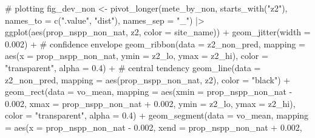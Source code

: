 \documentclass[
  letterpaper,
  DIV=11,
  numbers=noendperiod]{scrartcl}
\newenvironment{Shaded}{\begin{snugshade}}{\end{snugshade}}
\newcommand{\AttributeTok}[1]{\textcolor[rgb]{0.40,0.45,0.13}{#1}}
\newcommand{\CommentTok}[1]{\textcolor[rgb]{0.37,0.37,0.37}{#1}}
\newcommand{\FloatTok}[1]{\textcolor[rgb]{0.68,0.00,0.00}{#1}}
\newcommand{\FunctionTok}[1]{\textcolor[rgb]{0.28,0.35,0.67}{#1}}
\newcommand{\NormalTok}[1]{\textcolor[rgb]{0.00,0.23,0.31}{#1}}
\newcommand{\OtherTok}[1]{\textcolor[rgb]{0.00,0.23,0.31}{#1}}
\newcommand{\SpecialCharTok}[1]{\textcolor[rgb]{0.37,0.37,0.37}{#1}}
\newcommand{\StringTok}[1]{\textcolor[rgb]{0.13,0.47,0.30}{#1}}
\begin{document}
\begin{Shaded}
\begin{Highlighting}[]
\CommentTok{\# plotting}
\NormalTok{fig\_dev\_non }\OtherTok{\textless{}{-}} \FunctionTok{pivot\_longer}\NormalTok{(mete\_by\_non, }\FunctionTok{starts\_with}\NormalTok{(}\StringTok{"z2"}\NormalTok{), }
                            \AttributeTok{names\_to =} \FunctionTok{c}\NormalTok{(}\StringTok{".value"}\NormalTok{, }\StringTok{"dist"}\NormalTok{), }
                            \AttributeTok{names\_sep =} \StringTok{"\_"}\NormalTok{) }\SpecialCharTok{|\textgreater{}} 
    \FunctionTok{ggplot}\NormalTok{(}\FunctionTok{aes}\NormalTok{(prop\_nspp\_non\_nat, z2, }\AttributeTok{color =}\NormalTok{ site\_name)) }\SpecialCharTok{+}
    \FunctionTok{geom\_jitter}\NormalTok{(}\AttributeTok{width =} \FloatTok{0.002}\NormalTok{) }\SpecialCharTok{+}
    \CommentTok{\# confidence envelope}
    \FunctionTok{geom\_ribbon}\NormalTok{(}\AttributeTok{data =}\NormalTok{ z2\_non\_pred, }
                \AttributeTok{mapping =} \FunctionTok{aes}\NormalTok{(}\AttributeTok{x =}\NormalTok{ prop\_nspp\_non\_nat, }
                              \AttributeTok{ymin =}\NormalTok{ z2\_lo, }
                              \AttributeTok{ymax =}\NormalTok{ z2\_hi), }
                \AttributeTok{color =} \StringTok{"transparent"}\NormalTok{, }\AttributeTok{alpha =} \FloatTok{0.4}\NormalTok{) }\SpecialCharTok{+}
    \CommentTok{\# central tendency }
    \FunctionTok{geom\_line}\NormalTok{(}\AttributeTok{data =}\NormalTok{ z2\_non\_pred, }
              \AttributeTok{mapping =} \FunctionTok{aes}\NormalTok{(prop\_nspp\_non\_nat, z2), }
              \AttributeTok{color =} \StringTok{"black"}\NormalTok{) }\SpecialCharTok{+}
    \FunctionTok{geom\_rect}\NormalTok{(}\AttributeTok{data =}\NormalTok{ vo\_mean, }
              \AttributeTok{mapping =} \FunctionTok{aes}\NormalTok{(}\AttributeTok{xmin =}\NormalTok{ prop\_nspp\_non\_nat }\SpecialCharTok{{-}} \FloatTok{0.002}\NormalTok{, }
                            \AttributeTok{xmax =}\NormalTok{ prop\_nspp\_non\_nat }\SpecialCharTok{+} \FloatTok{0.002}\NormalTok{, }
                            \AttributeTok{ymin =}\NormalTok{ z2\_lo, }
                            \AttributeTok{ymax =}\NormalTok{ z2\_hi), }
              \AttributeTok{color =} \StringTok{"transparent"}\NormalTok{, }\AttributeTok{alpha =} \FloatTok{0.4}\NormalTok{) }\SpecialCharTok{+}
    \FunctionTok{geom\_segment}\NormalTok{(}\AttributeTok{data =}\NormalTok{ vo\_mean, }
              \AttributeTok{mapping =} \FunctionTok{aes}\NormalTok{(}\AttributeTok{x =}\NormalTok{ prop\_nspp\_non\_nat }\SpecialCharTok{{-}} \FloatTok{0.002}\NormalTok{, }
                            \AttributeTok{xend =}\NormalTok{ prop\_nspp\_non\_nat }\SpecialCharTok{+} \FloatTok{0.002}\NormalTok{, }

\end{Highlighting}
\end{Shaded}
\end{document}
